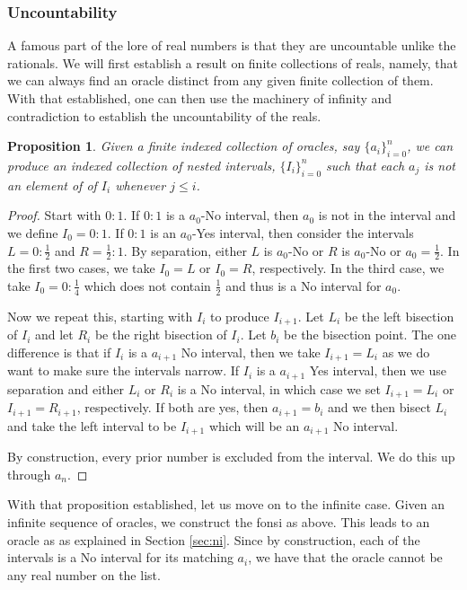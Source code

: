 \documentclass[12pt]{article}
\newtheorem{proposition}{Proposition}
\theoremstyle{remark}
\begin{document}
\subsubsection{Uncountability}

A famous part of the lore of real numbers is that they are uncountable unlike the rationals. We will first establish a result on finite collections of reals, namely, that we can always find an oracle distinct from any given finite collection of them. With that established, one can then use the machinery of infinity and contradiction to establish the uncountability of the reals. 

\begin{proposition}\label{pr:notlist}
Given a finite indexed collection of oracles, say $\{a_i\}_{i=0}^n$, we can produce an indexed collection of nested intervals, $\{I_i\}_{i=0}^n$ such that each $a_j$ is not an element of of $I_i$ whenever $j \leq i$.
\end{proposition}

\begin{proof}
Start with $0:1$. If $0:1$ is a $a_0$-No interval, then $a_0$ is not in the interval and we define $I_0 = 0:1$. If $0:1$ is an $a_0$-Yes interval, then consider the intervals $L= 0:\tfrac{1}{2}$ and $R = \tfrac{1}{2}:1$. By separation, either $L$ is $a_0$-No or $R$ is $a_0$-No or $a_0 = \tfrac{1}{2}$. In the first two cases, we take $I_0=L$ or $I_0=R$, respectively. In the third case, we take $I_0 = 0:\tfrac{1}{4}$ which does not contain $\tfrac{1}{2}$ and thus is a No interval for $a_0$.

Now we repeat this, starting with $I_i$ to produce $I_{i+1}$. Let $L_i$ be the left bisection of $I_i$ and let $R_i$ be the right bisection of $I_i$. Let $b_i$ be the bisection point. The one difference is that if $I_i$ is a $a_{i+1}$ No interval, then we take $I_{i+1} = L_i$ as we do want to make sure the intervals narrow. If $I_i$ is a $a_{i+1}$ Yes interval, then we use separation and either $L_i$ or $R_i$ is a No interval, in which case we set $I_{i+1} = L_i $ or $I_{i+1} = R_{i+1}$, respectively. If both are yes, then $a_{i+1} = b_i$ and we then bisect $L_i$ and take the left interval to be $I_{i+1}$ which will be an $a_{i+1}$ No interval. 

By construction, every prior number is excluded from the interval. We do this up through $a_n$.
\end{proof} 

With that proposition established, let us move on to the infinite case. Given an infinite sequence of oracles, we construct the fonsi as above. This leads to an oracle as as explained in Section \ref{sec:ni}. Since by construction, each of the intervals is a No interval for its matching $a_i$, we have that the oracle cannot be any real number on the list. 
\end{document}
